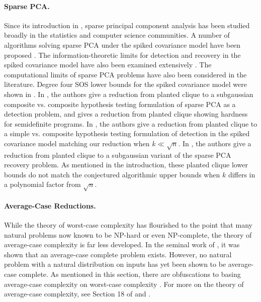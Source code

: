 \paragraph{Sparse PCA.} Since its introduction in \cite{johnstoneSparse04}, sparse principal component analysis has been studied broadly in the statistics and computer science communities. A number of algorithms solving sparse PCA under the spiked covariance model have been proposed \cite{amini2009high, ma2013sparse, cai2013sparse, berthet2013optimal, berthet2013complexity, shen2013consistency, krauthgamer2015semidefinite, deshpande2014sparse, wang2016statistical}. The information-theoretic limits for detection and recovery in the spiked covariance model have also been examined extensively \cite{amini2009high, vu2012minimax, berthet2013optimal, birnbaum2013minimax, cai2013sparse, wang2016statistical, cai2015optimal}. The computational limits of sparse PCA problems have also been considered in the literature. Degree four SOS lower bounds for the spiked covariance model were shown in \cite{ma2015sum}. In \cite{berthet2013complexity}, the authors give a reduction from planted clique to a subgaussian composite vs. composite hypothesis testing formulation of sparse PCA as a detection problem, and \cite{berthet2013optimal} gives a reduction from planted clique showing hardness for semidefinite programs. In \cite{gao2017sparse}, the authors give a reduction from planted clique to a simple vs. composite hypothesis testing formulation of detection in the spiked covariance model matching our reduction when $k \ll \sqrt{n}$. In \cite{wang2016statistical}, the authors give a reduction from planted clique to a subgaussian variant of the sparse PCA recovery problem. As mentioned in the introduction, these planted clique lower bounds do not match the conjectured algorithmic upper bounds when $k$ differs in a polynomial factor from $\sqrt{n}$.

\paragraph{Average-Case Reductions.} While the theory of worst-case complexity has flourished to the point that many natural problems now known to be NP-hard or even NP-complete, the theory of average-case complexity is far less developed. In the seminal work of \cite{levin1986average}, it was shown that an average-case complete problem exists. However, no natural problem with a natural distribution on inputs has yet been shown to be average-case complete. As mentioned in this section, there are obfuscations to basing average-case complexity on worst-case complexity \cite{bogdanov2006worst}. For more on the theory of average-case complexity, see Section 18 of \cite{arora2009computational} and \cite{bogdanov2006average}.


